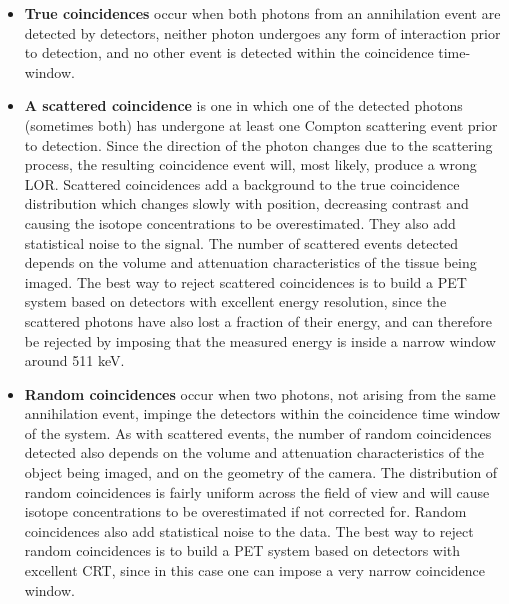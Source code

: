 \begin{itemize}
\item {\bf True coincidences} occur when both photons from an annihilation event are detected by detectors, neither photon undergoes any form of interaction prior to detection, and no other event is detected within the coincidence time-window.
\item {\bf A scattered coincidence} is one in which one of the detected photons (sometimes both) has undergone at least one Compton scattering event prior to detection. Since the direction of the photon changes due to the scattering process, the resulting coincidence event will, most likely, produce a wrong LOR. Scattered coincidences add a background to the true coincidence distribution which changes slowly with position, decreasing contrast and causing the isotope concentrations to be overestimated. They also add statistical noise to the signal. The number of scattered events detected depends on the volume and attenuation characteristics of the tissue being imaged. The best way to reject scattered coincidences is to build a PET system based on detectors with excellent energy resolution, since the scattered photons have also lost a fraction of their energy, and can therefore be rejected by imposing that the measured energy is inside a narrow window around 511 keV.
\item {\bf Random coincidences} occur when two photons, not arising from the same annihilation event, impinge the detectors within the coincidence time window of the system. As with scattered events, the number of random coincidences detected also depends on the volume and attenuation characteristics of the object being imaged, and on the geometry of the camera. The distribution of random coincidences is fairly uniform across the field of view and will cause isotope concentrations to be overestimated if not corrected for. Random coincidences also add statistical noise to the data. The best way to reject random coincidences is to build a PET system based on detectors with excellent CRT, since in this case one can impose a very narrow coincidence window. 
\end{itemize}


